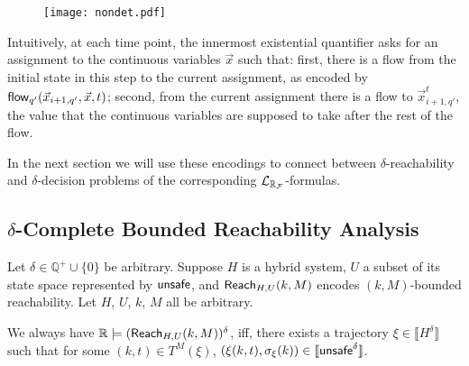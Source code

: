 \documentclass[12pt]{article}
\begin{document}
\begin{figure}[h!]
\begin{center}
\texttt{[image: nondet.pdf]}
\end{center}
\caption{}
\end{figure}



Intuitively, at each time point, the innermost existential quantifier asks for an assignment to the continuous variables $\vec x$ such that: first, there is a flow from the initial state in this step to the current assignment, as encoded by $\mathsf{flow}_{q'}(\vec x_{i+1,q'}, \vec x,t)$; second, from the current assignment there is a flow to $\vec x^t_{i+1,q'}$, the value that the continuous variables are supposed to take after the rest of the flow.

In the next section we will use these encodings to connect between $\delta$-reachability and $\delta$-decision problems of the corresponding $\mathcal{L}_{\mathbb{R}_{\mathcal{F}}}$-formulas. 

\subsection{$\delta$-Complete Bounded Reachability Analysis}

\begin{lemma}\label{equiv-delta}
Let $\delta\in\mathbb{Q}^+\cup \{0\}$ be arbitrary. Suppose $H$ is a hybrid system, $U$ a subset of its state space represented by $\mathsf{unsafe}$, and $\mathsf{Reach}_{H,U}(k,M)$ encodes $(k,M)$-bounded reachability. Let $H$, $U$, $k$, $M$ all be arbitrary. 

We always have $\mathbb{R}\models(\mathsf{Reach}_{H,U}(k,M))^{\delta}$, iff, there exists a trajectory $\xi\in\llbracket H^{\delta}\rrbracket$ such that for some $(k,t)\in T^{M}(\xi)$, $(\xi(k, t), \sigma_{\xi}(k))\in \llbracket \mathsf{unsafe}^{\delta}\rrbracket$.
\end{lemma}
\end{document}
